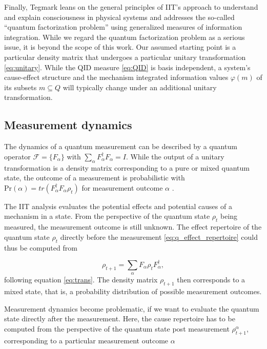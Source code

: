 \documentclass[preprints, article, accept, pdftex, moreauthors, letterpaper]{Definitions/mdpi}
\renewcommand{\=}[1]{\stackrel{#1}{=}} %
\renewcommand{\P}{\text{Pr}} %
\renewcommand{\*}{\otimes}%
\begin{document}
Finally, Tegmark \cite{Tegmark2015} leans on the general principles of IIT's approach to understand and explain consciousness in physical systems and addresses the so-called ``quantum factorization problem'' \cite{Schwindt2012} using generalized measures of information integration.
While we regard the quantum factorization problem as a serious issue, it is beyond the scope of this work. Our assumed starting point is a particular density matrix that undergoes a particular unitary transformation \eqref{eq:unitary}. While the QID measure \eqref{eq:QID} is basis independent, a system's cause-effect structure and the mechanism integrated information values $\varphi(m)$ of its subsets $m \subseteq Q$ will typically change under an additional unitary transformation.

\subsection{Measurement dynamics}
\label{sec:measurements}

The dynamics of a quantum measurement can be described by a quantum operator $\mathcal{F} = \{F_\alpha\}$ with $\sum_\alpha F_\alpha^\dag F_\alpha = I$. While the output of a unitary transformation is a density matrix corresponding to a pure or mixed quantum state, the outcome of a measurement is probabilistic with $\P(\alpha) = tr(F_\alpha^\dag F_\alpha \rho_t)$ for measurement outcome $\alpha$ \cite{NielsonChuang2011}. 

The IIT analysis evaluates the potential effects and potential causes of a mechanism in a state. From the perspective of the quantum state $\rho_t$ being measured, the measurement outcome is still unknown. The effect repertoire of the quantum state $\rho_t$ directly before the measurement \eqref{eq:q_effect_repertoire} could thus be computed from

\begin{equation}
\label{eq:e_measurement}
    \rho_{t+1} = \sum_\alpha F_\alpha \rho_t F_\alpha^\dag,
\end{equation}
%
following equation \eqref{eq:trans}. The density matrix $\rho_{t+1}$ then corresponds to a mixed state, that is, a probability distribution of possible measurement outcomes.

Measurement dynamics become problematic, if we want to evaluate the quantum state directly after the measurement. Here, the cause repertoire has to be computed from the perspective of the quantum state post measurement $\rho^{\alpha}_{t+1}$, corresponding to a particular measurement outcome $\alpha$ 
\end{document}
